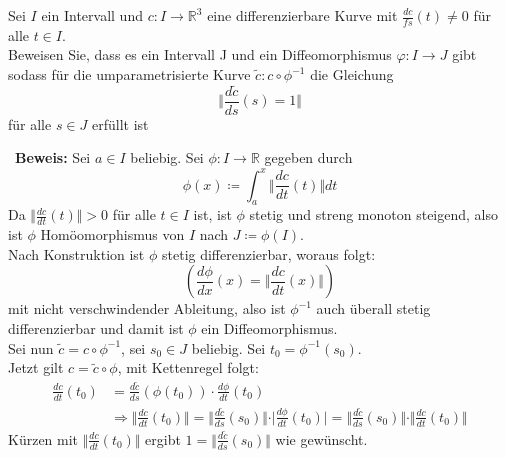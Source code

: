 \begin{assignment}
    Sei \( I \) ein Intervall und \( c: I \to \mathbb{R}^3 \) eine differenzierbare Kurve mit \( \frac{dc}{fs}(t) \neq 0 \) für alle \( t \in I \). \\
    Beweisen Sie, dass es ein Intervall J und ein Diffeomorphismus $\varphi : I \to J$ gibt sodass für die umparametrisierte Kurve \( \tilde{c}: c \circ \phi^{-1} \) die Gleichung 
    \begin{equation*}
    \Vert \frac{d\tilde{c}}{ds}(s) = 1 \Vert
  \end{equation*}
  für alle \( s \in J \) erfüllt ist
\end{assignment}
\begin{solution}
 \
\textbf{Beweis:} Sei \( a \in I \) beliebig. Sei \( \phi: I \to \mathbb{R} \) gegeben durch 
  \begin{equation*}
    \phi(x) \coloneqq \int_a^x { \Vert \frac{dc}{dt}(t) \Vert}dt
  \end{equation*}
  Da \( \Vert \frac{dc}{dt}(t) \Vert > 0 \) für alle \( t \in I \) ist, ist \( \phi \) stetig und streng monoton steigend, also ist \( \phi \) Homöomorphismus von \( I \) nach \( J \coloneqq \phi (I) \). \\
  Nach Konstruktion ist \( \phi \) stetig differenzierbar, woraus folgt:
  \begin{equation*}
    \left(\frac{d \phi}{dx}(x) = \Vert \frac{dc}{dt}(x) \Vert\right)
  \end{equation*}
  mit nicht verschwindender Ableitung, also ist \( \phi^{-1} \) auch überall stetig differenzierbar und damit ist \( \phi \) ein Diffeomorphismus. \\
  Sei nun \( \tilde{c} = c \circ \phi^{-1} \), sei \( s_0 \in J \) beliebig. Sei \( t_0 = \phi^{-1}(s_0) \). \\
  Jetzt gilt \( c = \tilde{c} \circ \phi \), mit Kettenregel folgt:
  \begin{align*}
    \frac{dc}{dt}(t_0) &= \frac{d \tilde{c}}{ds}(\phi(t_0))\cdot \frac{d \phi}{dt}(t_0) \\
    &\Rightarrow \Vert \frac{dc}{dt}(t_0)\Vert = \Vert \frac{d \tilde{c}}{ds}(s_0) \Vert \cdot \vert \frac{d \phi}{dt}(t_0) \vert = \Vert \frac{d \tilde{c}}{ds}(s_0) \Vert \cdot \Vert \frac{dc}{dt}(t_0) \Vert
  \end{align*}
  Kürzen mit \( \Vert \frac{dc}{dt} (t_0) \Vert \) ergibt \( 1 = \Vert \frac{d \tilde{c}}{ds}(s_0) \Vert \) wie gewünscht. \\
\end{solution}

